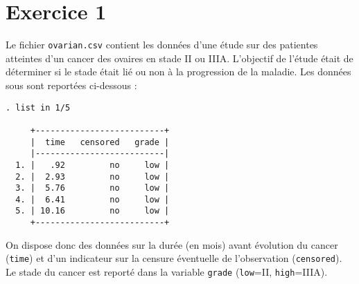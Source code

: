 \section*{Exercice 1}
Le fichier \texttt{ovarian.csv} contient les données d'une étude sur des
patientes atteintes d'un cancer des ovaires en stade II ou IIIA. L'objectif
de l'étude était de déterminer si le stade était lié ou non à la progression
de la maladie. Les données sous \Stata sont reportées
ci-dessous :
\begin{verbatim}
. list in 1/5

     +--------------------------+
     |  time   censored   grade |
     |--------------------------|
  1. |   .92         no     low |
  2. |  2.93         no     low |
  3. |  5.76         no     low |
  4. |  6.41         no     low |
  5. | 10.16         no     low |
     +--------------------------+
\end{verbatim}
On dispose donc des données sur la durée (en mois) avant évolution du cancer
(\texttt{time}) et d'un indicateur sur la censure éventuelle de
l'observation (\texttt{censored}). Le stade du cancer est reporté dans la
variable \texttt{grade} (\texttt{low}=II, \texttt{high}=IIIA).

